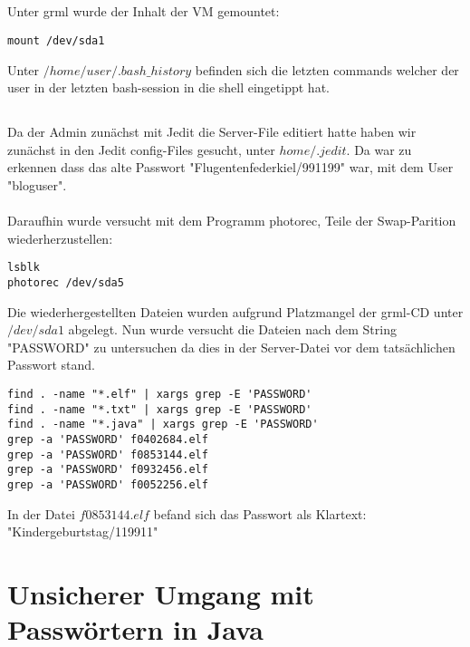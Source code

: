 \documentclass[12pt]{article}
\theoremstyle{plain}
\begin{document}
\subsection{}
Unter grml wurde der Inhalt der VM gemountet:
\begin{lstlisting} 
mount /dev/sda1
\end{lstlisting}
Unter $/home/user/.bash\_history$ befinden sich die letzten commands welcher der user in der letzten bash-session in die shell eingetippt hat.
\subsection{}
Da der Admin zunächst mit Jedit die Server-File editiert hatte haben wir zunächst in den Jedit config-Files gesucht, unter $home/.jedit$. Da war zu erkennen dass das alte Passwort "Flugentenfederkiel/991199" war, mit dem User "bloguser". \\ \\ Daraufhin wurde versucht mit dem Programm photorec, Teile der Swap-Parition wiederherzustellen:
\begin{lstlisting}
lsblk
photorec /dev/sda5
\end{lstlisting}
Die wiederhergestellten Dateien wurden aufgrund Platzmangel der grml-CD unter $/dev/sda1$ abgelegt. Nun wurde versucht die Dateien nach dem String "PASSWORD" zu untersuchen da dies in der Server-Datei vor dem tatsächlichen Passwort stand.
\begin{lstlisting}
find . -name "*.elf" | xargs grep -E 'PASSWORD'
find . -name "*.txt" | xargs grep -E 'PASSWORD'
find . -name "*.java" | xargs grep -E 'PASSWORD'
grep -a 'PASSWORD' f0402684.elf
grep -a 'PASSWORD' f0853144.elf
grep -a 'PASSWORD' f0932456.elf
grep -a 'PASSWORD' f0052256.elf
\end{lstlisting}
In der Datei $f0853144.elf$ befand sich das Passwort als Klartext: "Kindergeburtstag/119911"
\section{Unsicherer Umgang mit Passwörtern in Java}
\end{document}
